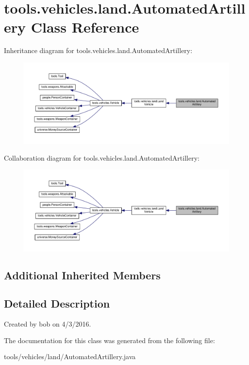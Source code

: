 \hypertarget{classtools_1_1vehicles_1_1land_1_1_automated_artillery}{}\section{tools.\+vehicles.\+land.\+Automated\+Artillery Class Reference}
\label{classtools_1_1vehicles_1_1land_1_1_automated_artillery}


Inheritance diagram for tools.\+vehicles.\+land.\+Automated\+Artillery\+:\nopagebreak
\begin{figure}[H]
\begin{center}
\leavevmode
\includegraphics[width=350pt]{classtools_1_1vehicles_1_1land_1_1_automated_artillery__inherit__graph}
\end{center}
\end{figure}


Collaboration diagram for tools.\+vehicles.\+land.\+Automated\+Artillery\+:\nopagebreak
\begin{figure}[H]
\begin{center}
\leavevmode
\includegraphics[width=350pt]{classtools_1_1vehicles_1_1land_1_1_automated_artillery__coll__graph}
\end{center}
\end{figure}
\subsection*{Additional Inherited Members}


\subsection{Detailed Description}
Created by bob on 4/3/2016. 

The documentation for this class was generated from the following file\+:\begin{DoxyCompactItemize}
\item 
tools/vehicles/land/Automated\+Artillery.\+java\end{DoxyCompactItemize}
